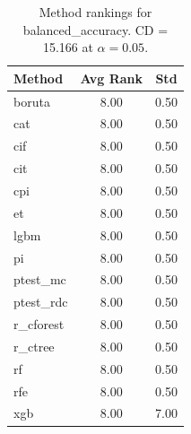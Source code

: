 \begin{table}[h]
\centering
\caption{Method rankings for balanced_accuracy. CD = 15.166 at $\alpha=0.05$.}
\label{tab:ranks_balanced_accuracy}
\begin{tabular}{lcc}
\toprule
Method & Avg Rank & Std \\
\midrule
boruta & 8.00 & 0.50 \\
cat & 8.00 & 0.50 \\
cif & 8.00 & 0.50 \\
cit & 8.00 & 0.50 \\
cpi & 8.00 & 0.50 \\
et & 8.00 & 0.50 \\
lgbm & 8.00 & 0.50 \\
pi & 8.00 & 0.50 \\
ptest_mc & 8.00 & 0.50 \\
ptest_rdc & 8.00 & 0.50 \\
r_cforest & 8.00 & 0.50 \\
r_ctree & 8.00 & 0.50 \\
rf & 8.00 & 0.50 \\
rfe & 8.00 & 0.50 \\
xgb & 8.00 & 7.00 \\
\bottomrule
\end{tabular}
\end{table}